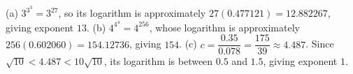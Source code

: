 (a) $3^{3^3}=3^{27}$, so its logarithm is approximately $27(0.477121)=12.882267$, giving exponent $\boxed{13}$.
(b) $4^{4^4}=4^{256}$, whose logarithm is approximately $256(0.602060)=154.12736$, giving $\boxed{154}$.
(c) $c=\dfrac{0.35}{0.078}=\dfrac{175}{39}\approx4.487$. Since $\sqrt{10}<4.487<10\sqrt{10}$, its logarithm is between $0.5$ and $1.5$, giving exponent $\boxed1$.
